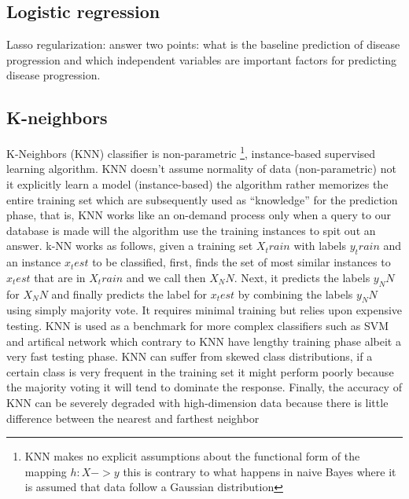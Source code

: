 \documentclass[11pt]{article}
\begin{document}
\subsection{Logistic regression}

Lasso regularization: answer two points: what is the baseline prediction of disease progression and  which independent variables are important factors for predicting disease progression.

\subsection{K-neighbors}
K-Neighbors (KNN) classifier is non-parametric \footnote{KNN makes no explicit assumptions about the functional form of the mapping $h:X->y$ this is contrary to what happens in naive Bayes where it is assumed that data follow a Gaussian distribution}, instance-based supervised learning algorithm. KNN doesn't assume normality of data (non-parametric) not it explicitly learn a model (instance-based) the algorithm rather memorizes the entire training set which are subsequently used as “knowledge” for the prediction phase, that is, KNN works like an on-demand process only when a query to our database is made will the algorithm use the training instances to spit out an answer. 
k-NN works as follows, given a training set $X_train$ with labels $y_train$ and an instance $x_test$ to be classified, first, finds the set of most similar instances to $x_test$ that are in $X_train$ and we call then $X_NN$. Next, it predicts the labels $y_NN$ for $X_NN$ and finally predicts the label for $x_test$ by combining the labels $y_NN$ using simply majority vote. 
It requires minimal training but relies upon expensive testing. KNN is used as a benchmark for more complex classifiers such as SVM and artifical network which contrary to KNN have lengthy training phase albeit a very fast testing phase. KNN can suffer from skewed class distributions, if a certain class is very frequent in the training set it might perform poorly because the majority voting 
it will tend to dominate the response. Finally, the accuracy of KNN can be severely degraded with high-dimension data because there is little difference between the nearest and farthest neighbor
\end{document}
